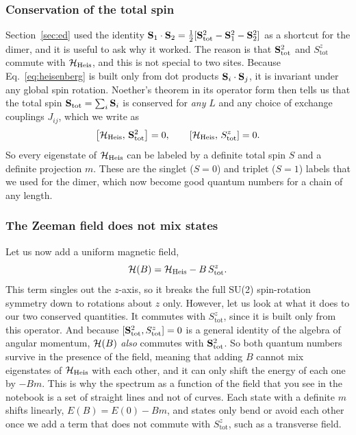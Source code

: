 \documentclass[lecture_notes.tex]{subfiles}
\begin{document}
\subsubsection{Conservation of the total spin}
Section~\ref{sec:ed} used the identity $\vb S_1\cdot\vb S_2=\tfrac12[\vb S_{\mathrm{tot}}^2 - \vb
S_1^2-\vb S_2^2]$ as a shortcut for the dimer, and it is useful to ask why it worked. The reason is
that $\vb S_{\mathrm{tot}}^2$ and $S_{\mathrm{tot}}^z$ commute with $\mathcal{H}_{\mathrm{Heis}}$, and this
is not special to two sites. Because Eq.~\eqref{eq:heisenberg} is built only from dot products
$\vb S_i\cdot\vb S_j$, it is invariant under any global spin rotation. Noether's theorem in its
operator form then tells us that the total spin $\vb S_{\mathrm{tot}}=\sum_i \vb S_i$ is conserved
for \emph{any} $L$ and any choice of exchange couplings $J_{ij}$, which we write as
\begin{equation}
  \left[\mathcal{H}_{\mathrm{Heis}},\, \vb S_{\mathrm{tot}}^2\right] = 0, \qquad
  \left[\mathcal{H}_{\mathrm{Heis}},\, S_{\mathrm{tot}}^z\right] = 0.
  \label{eq:conservation}
\end{equation}
So every eigenstate of $\mathcal{H}_{\mathrm{Heis}}$ can be labeled by a definite total spin $S$ and a
definite projection $m$. These are the singlet ($S=0$) and triplet ($S=1$) labels that we used for
the dimer, which now become good quantum numbers for a chain of any length.

\subsubsection{The Zeeman field does not mix states}
Let us now add a uniform magnetic field,
\begin{equation}
  \mathcal{H}(B) = \mathcal{H}_{\mathrm{Heis}} - B\, S_{\mathrm{tot}}^z.
  \label{eq:zeeman}
\end{equation}
This term singles out the $z$-axis, so it breaks the full SU(2) spin-rotation symmetry down to
rotations about $z$ only. However, let us look at what it does to our two conserved quantities. It
commutes with $S_{\mathrm{tot}}^z$, since it is built only from this operator. And because
$[\vb S_{\mathrm{tot}}^2, S_{\mathrm{tot}}^z]=0$ is a general identity of the algebra of angular
momentum, $\mathcal{H}(B)$ \emph{also} commutes with $\vb S_{\mathrm{tot}}^2$. So both quantum numbers
survive in the presence of the field, meaning that adding $B$ cannot mix eigenstates of
$\mathcal{H}_{\mathrm{Heis}}$ with each other, and it can only shift the energy of each one by $-Bm$. This
is why the spectrum as a function of the field that you see in the notebook is a set of straight
lines and not of curves. Each state with a definite $m$ shifts linearly, $E(B)=E(0)-Bm$, and states
only bend or avoid each other once we add a term that does not commute with $S_{\mathrm{tot}}^z$,
such as a transverse field.
\end{document}
